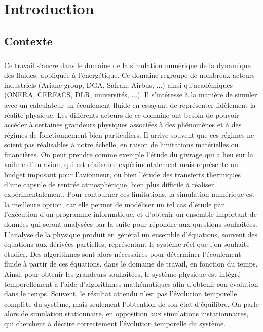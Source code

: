 \chapter*{Introduction}


  \section*{Contexte}

    \paragraph{}
    Ce travail s'ancre dans le domaine de la simulation numérique de la dynamique des fluides, appliquée à l'énergétique.
    Ce domaine regroupe de nombreux acteurs industriels (Ariane group, DGA, Safran, Airbus, ...) ainsi qu'académiques (ONERA, CERFACS, DLR, universités, ...).
    Il s'intéresse à la manière de simuler avec un calculateur un écoulement fluide en essayant de représenter fidèlement la réalité physique.
    Les différents acteurs de ce domaine ont besoin de pouvoir accéder à certaines grandeurs physiques associées à des phénomènes et à des régimes de fonctionnement bien particuliers.
    Il arrive souvent que ces régimes ne soient pas réalisables à notre échelle, en raison de limitations matérielles ou financières.
    On peut prendre comme exemple l’étude du givrage qui a lieu sur la voilure d’un avion, qui est réalisable expérimentalement mais représente un budget imposant pour l’avionneur, ou bien l’étude des transferts thermiques d’une capsule de rentrée atmosphérique, bien plus difficile à réaliser expérimentalement.
    Pour contourner ces limitations, la simulation numérique est la meilleure option, car elle permet de modéliser un tel cas d’étude par l’exécution d’un programme informatique, et d’obtenir un ensemble important de données qui seront analysées par la suite pour répondre aux questions souhaitées.
    L'analyse de la physique produit en général un ensemble d'équations, souvent des équations aux dérivées partielles, représentant le système réel que l'on souhaite étudier.
    Des algorithmes sont alors nécessaires pour déterminer l'écoulement fluide à partir de ces équations, dans le domaine de travail, en fonction du temps.
    Ainsi, pour obtenir les grandeurs souhaitées, le système physique est intégré temporellement à l'aide d'algorithmes mathématiques afin d'obtenir son évolution dans le temps.
    Souvent, le résultat attendu n'est pas l'évolution temporelle complète du système, mais seulement l'obtention de son état d'équilibre.
    On parle alors de simulation stationnaire, en opposition aux simulations instationnaires, qui cherchent à décrire correctement l'évolution temporelle du système.

